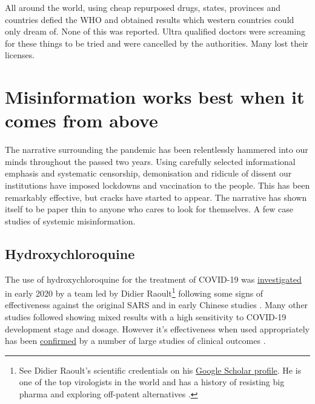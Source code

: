 \documentclass[11pt,a4paper,notitlepage]{report}
\begin{document}
All around the world, using cheap repurposed drugs, states, provinces and countries defied the WHO and obtained results which western countries could only dream of. None of this was reported. Ultra qualified doctors were screaming for these things to be tried and were cancelled by the authorities. Many lost their licenses. 

\section*{Misinformation works best when it comes from above}

The narrative surrounding the pandemic has been relentlessly hammered into our minds throughout the passed two years. Using carefully selected informational emphasis and systematic censorship, demonisation and ridicule of dissent our institutions have imposed lockdowns and vaccination to the people. This has been remarkably effective, but cracks have started to appear. The narrative has shown itself to be paper thin to anyone who cares to look for themselves. A few case studies of systemic misinformation.

\subsection*{Hydroxychloroquine}

The use of hydroxychloroquine for the treatment of COVID-19 was \href{https://pubmed.ncbi.nlm.nih.gov/32205204/}{investigated} in early 2020 by a team led by Didier Raoult\footnote{See Didier Raoult's scientific credentials on his \href{https://scholar.google.fr/citations?user=n8EF_6kAAAAJ&hl=fr}{Google Scholar profile}. He is one of the top virologists in the world and has a history of resisting big pharma and exploring off-patent alternatives \cite{doi:10.1177/1440783320936740}.} following some signs of effectiveness against the original SARS and in early Chinese studies \cite{Lagier2020-dw}. Many other studies followed showing mixed results with a high sensitivity to COVID-19 development stage and dosage. However it's effectiveness when used appropriately has been \href{https://www.ncbi.nlm.nih.gov/pmc/articles/PMC8023208/}{confirmed} by a number of large studies of clinical outcomes \cite{Mokhtari2021-ot}. 
\end{document}
